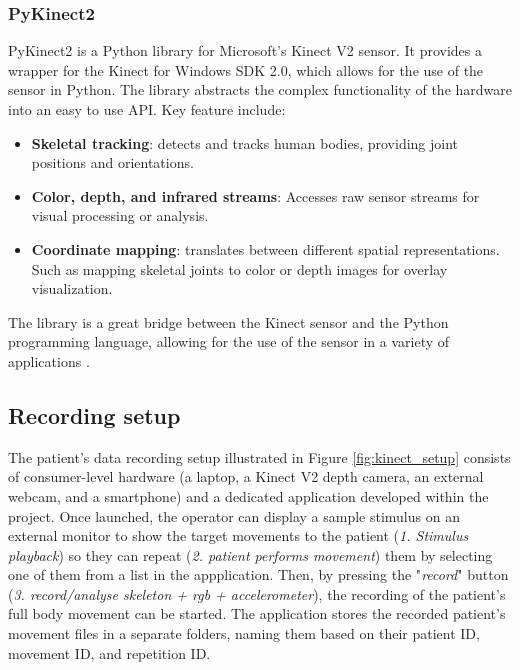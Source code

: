                     \subsubsection{PyKinect2}
                        PyKinect2 is a Python library for Microsoft's Kinect V2 sensor. It provides a wrapper for the Kinect for Windows SDK 2.0, which allows for the use of the sensor in Python. The library abstracts the complex functionality of the hardware into an easy to use API. Key feature include:
                        \begin{itemize}
                            \item \textbf{Skeletal tracking}: detects and tracks human bodies, providing joint positions and orientations.
                            \item \textbf{Color, depth, and infrared streams}: Accesses raw sensor streams for visual processing or analysis.
                            \item \textbf{Coordinate mapping}: translates between different spatial representations. Such as mapping skeletal joints to color or depth images for overlay visualization.
                        \end{itemize}
                        The library is a great bridge between the Kinect sensor and the Python programming language, allowing for the use of the sensor in a variety of applications \cite{GitHubKinectPyKinect2}.
               
                        \newpage
                        
        \subsection{Recording setup}

                    The patient's data recording setup illustrated in Figure \ref{fig:kinect_setup} consists of consumer-level hardware (a laptop, a Kinect V2 depth camera, an external webcam, and a smartphone) and a dedicated application developed within the project. 
                    Once launched, the operator can display a sample stimulus on an external monitor to show the target movements to the patient (\textit{1. Stimulus playback}) so they can repeat (\textit{2. patient performs movement}) them by selecting one of them from a list in the appplication.
                    Then, by pressing the "\textit{record}" button (\textit{3. record/analyse skeleton + rgb + accelerometer}), the recording of the patient's full body movement can be started. 
                    The application stores the recorded patient's movement files in a separate folders, naming them based on their patient ID, movement ID, and repetition ID.

